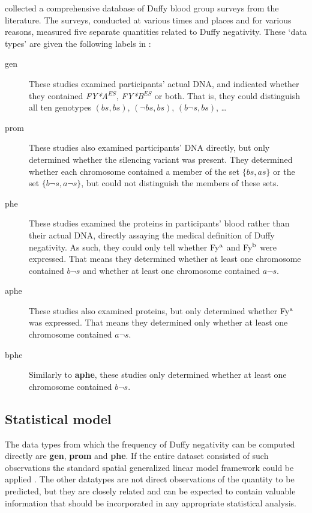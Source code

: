\documentclass[article]{jss}
\begin{document}
\cite{Howes} collected a comprehensive database of Duffy blood group surveys from the literature. The surveys, conducted at various times and places and for various reasons, measured five separate quantities related to Duffy negativity. These `data types' are given the following labels in :
\begin{description}
    \item[gen] These studies examined participants' actual DNA, and indicated whether they contained \emph{FY*A}$^{ES}$, \emph{FY*B}$^{ES}$ or both. That is, they could distinguish all ten genotypes $(bs,bs)$, $(\neg bs,bs)$, $(b\neg s,bs)$, \ldots
    \item[prom] These studies also examined participants' DNA directly, but only determined whether the silencing variant was present. They determined whether each chromosome contained a member of the set $\{bs,as\}$ or the set $\{b\neg s, a\neg s\}$, but could not distinguish the members of these sets.
    \item[phe] These studies examined the proteins in participants' blood rather than their actual DNA, directly assaying the medical definition of Duffy negativity. As such, they could only tell whether Fy$^\textup{a}$ and Fy$^\textup{b}$ were expressed. That means they determined whether at least one chromosome contained $b\neg s$ and whether at least one chromosome contained $a\neg s$.
    \item[aphe] These studies also examined proteins, but only determined whether Fy$^\textup{a}$ was expressed. That means they determined only whether at least one chromosome contained $a\neg s$.
    \item[bphe] Similarly to \textbf{aphe}, these studies only determined whether at least one chromosome contained $b\neg s$.
\end{description}

\subsection{Statistical model}
The data types from which the frequency of Duffy negativity can be computed directly are \textbf{gen}, \textbf{prom} and \textbf{phe}. If the entire dataset consisted of such observations the standard spatial generalized linear model framework could be applied \citep{standard-glm}. The other datatypes are not direct observations of the quantity to be predicted, but they are closely related and can be expected to contain valuable information that should be incorporated in any appropriate statistical analysis. 
\end{document}
